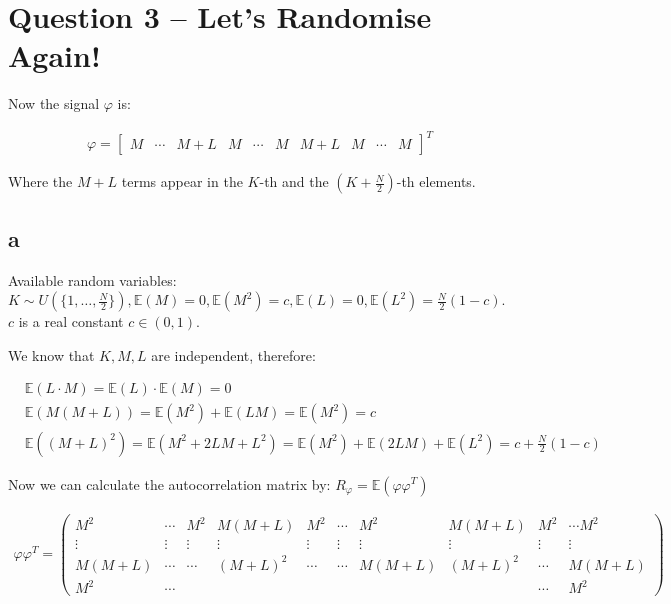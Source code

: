 \documentclass[a4paper]{article}
\begin{document}
\newpage
\section*{Question 3 -- Let’s Randomise Again!}

Now the signal $\varphi$ is: 

\begin{align*}
    \varphi = \begin{bmatrix} M & \cdots & M+L & M & \cdots & M & M+L & M & \cdots & M \end{bmatrix}^T
\end{align*}

Where the $M+L$ terms appear in the $K$-th and the $(K+\frac{N}{2})$-th elements.

\subsection*{a}

Available random variables: $K \sim U(\{1,\dots,\frac{N}{2}\}), \mathbb{E}(M)=0, \mathbb{E}(M^2)=c, \mathbb{E}(L)=0, \mathbb{E}(L^2)=\frac{N}{2}(1-c)$. \\
$c$ is a real constant $c\in(0,1)$.

We know that $K,M,L$ are independent, therefore:

\begin{align*}
    & \mathbb{E}(L\cdot M)=\mathbb{E}(L)\cdot \mathbb{E}(M)=0 \\
    & \mathbb{E}(M(M+L))=\mathbb{E}(M^2)+\mathbb{E}(LM)=\mathbb{E}(M^2)=c \\
    & \mathbb{E}((M+L)^2)=\mathbb{E}(M^2+2LM+L^2)=\mathbb{E}(M^2)+\mathbb{E}(2LM)+\mathbb{E}(L^2) = c+\frac{N}{2}(1-c)
\end{align*}

Now we can calculate the autocorrelation matrix by: $R_\varphi = \mathbb{E}(\varphi \varphi^T)$

\begin{align*}
    \varphi \varphi^T = 
    \begin{pmatrix}
        M^2 & \cdots & M^2 & M(M+L) & M^2 & \cdots & M^2 & M(M+L) & M^2 & \cdots  M^2 \\ 
        \vdots & \vdots & \vdots & \vdots & \vdots & \vdots & \vdots & \vdots & \vdots & \vdots \\
        M(M+L) & \cdots & \cdots & (M+L)^2 & \cdots & \cdots & M(M+L) & (M+L)^2 & \cdots & M(M+L) \\
        M^2 & \cdots  & & & & & & & \cdots & M^2
    \end{pmatrix}
\end{align*}
\end{document}
